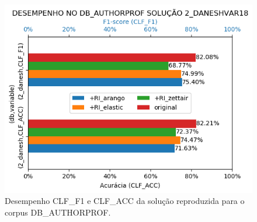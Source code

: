 \begin{figure}[h]
    \centering
    \caption{Desempenho CLF\_F1 e CLF\_ACC da solução reproduzida para o corpus DB\_AUTHORPROF.}
    \vspace{-0.0cm}
    \begin{center}
        \includegraphics[scale=0.75]{img/clf-bars-authorprof.png}
    \end{center}
    \vspace{-0.0cm}
    \label{fig:clf-bars-authorprof}
\end{figure}